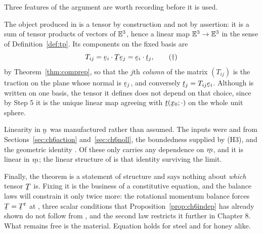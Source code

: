 
Three features of the argument are worth recording before it is used.

The object produced in  is a tensor by construction and not
by assertion: it is a sum of tensor products of vectors of $\mathbb{E}^{3}$, hence
a linear map $\mathbb{E}^{3}\to\mathbb{E}^{3}$ in the sense of Definition~\ref{def:tp}. Its
components on the fixed basis are
\begin{equation}
   T_{ij}=\ip{\be_{i}}{\bT\be_{j}}=\ip{\be_{i}}{\bt_{j}} ,
   \tag{$\dagger$}\label{eq:ch6Tcomp}
\end{equation}
by Theorem~\ref{thm:comprep}, so that the $j$th \emph{column} of the
matrix $(T_{ij})$ is the traction on the plane whose normal is
$\be_{j}$, and conversely $\bt_{j}=T_{ij}\be_{i}$. Although 
is written on one basis, the tensor it defines does not depend on that
choice, since by Step 5 it is the unique linear map agreeing with
$\bt(\bx_{0};\cdot)$ on the whole unit sphere.

Linearity in $\bn$ was manufactured rather than assumed. The inputs were
 and  from Sections~\ref{sec:ch6action}
and~\ref{sec:ch6noll}, the boundedness supplied by \textup{(H3)}, and
the geometric identity . Of these only  carries
any dependence on $\bm$, and it is linear in $\bm$; the linear structure
of  is that identity surviving the limit.

Finally, the theorem is a statement of structure and says nothing about
\emph{which} tensor $\bT$ is. Fixing it is the business of a
constitutive equation, and the balance laws will constrain it only
twice more: the rotational momentum balance forces
$\bT=\bT^{t}$ at , three scalar conditions that
Proposition~\ref{prop:ch6indep} has already shown do not follow from
, and the second law restricts it further in Chapter 8. What
remains free is the material. Equation  holds for steel and
for honey alike.

